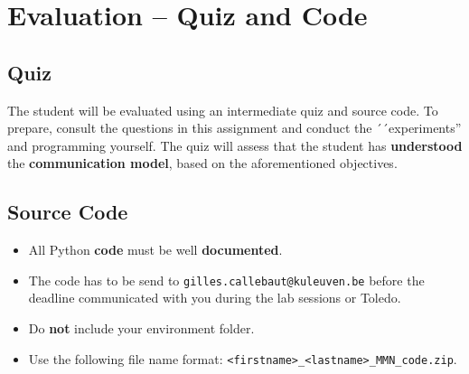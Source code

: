 \documentclass[12pt,a4paper]{article}
\begin{document}
\section{Evaluation -- Quiz and Code}

\subsection{Quiz}
The student will be evaluated using an intermediate quiz and source code. To prepare, consult the questions in this assignment and conduct the ´´experiments'' and programming yourself. The quiz will assess that the student has \textbf{understood} the \textbf{communication model}, based on the aforementioned objectives. 

\subsection{Source Code}
\begin{itemize}
	\item All Python \textbf{code} must be well \textbf{documented}.
	\item The code has to be send to \texttt{gilles.callebaut@kuleuven.be} before the deadline communicated with you during the lab sessions or Toledo.
	\item Do \textbf{not} include your environment folder. 
	\item Use the following file name format: \texttt{<firstname>\_<lastname>\_MMN\_code.zip}.
\end{itemize}







\end{document}
